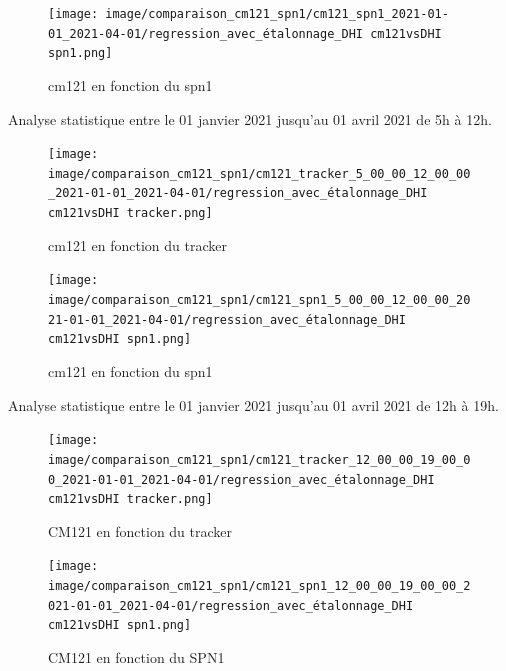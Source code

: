 \documentclass[12pt,a4paper]{article}
\begin{document}
\begin{flushleft}
\begin{figure}[H]
\centering
\texttt{[image: image/comparaison\_cm121\_spn1/cm121\_spn1\_2021-01-01\_2021-04-01/regression\_avec\_étalonnage\_DHI cm121vsDHI spn1.png]}  
\caption{cm121 en fonction du spn1} 
\end{figure}


Analyse statistique entre le 01 janvier 2021 jusqu'au 01 avril 2021 de 5h à 12h.

\begin{figure}[H]
\centering
\texttt{[image: image/comparaison\_cm121\_spn1/cm121\_tracker\_5\_00\_00\_12\_00\_00\_2021-01-01\_2021-04-01/regression\_avec\_étalonnage\_DHI cm121vsDHI tracker.png]}  
\caption{cm121 en fonction du tracker}
\end{figure}

\begin{figure}[H]
\centering
\texttt{[image: image/comparaison\_cm121\_spn1/cm121\_spn1\_5\_00\_00\_12\_00\_00\_2021-01-01\_2021-04-01/regression\_avec\_étalonnage\_DHI cm121vsDHI spn1.png]}  
\caption{cm121 en fonction du spn1}  
\end{figure}



Analyse statistique entre le 01 janvier 2021 jusqu'au 01 avril 2021 de 12h à 19h.


\begin{figure}[H]
\centering
\texttt{[image: image/comparaison\_cm121\_spn1/cm121\_tracker\_12\_00\_00\_19\_00\_00\_2021-01-01\_2021-04-01/regression\_avec\_étalonnage\_DHI cm121vsDHI tracker.png]} 
\caption{CM121 en fonction du tracker}    
\end{figure}

\begin{figure}[H]
\centering
\texttt{[image: image/comparaison\_cm121\_spn1/cm121\_spn1\_12\_00\_00\_19\_00\_00\_2021-01-01\_2021-04-01/regression\_avec\_étalonnage\_DHI cm121vsDHI spn1.png]}  
\caption{CM121 en fonction du SPN1}   
\end{figure}




\end{flushleft}






\end{document}

